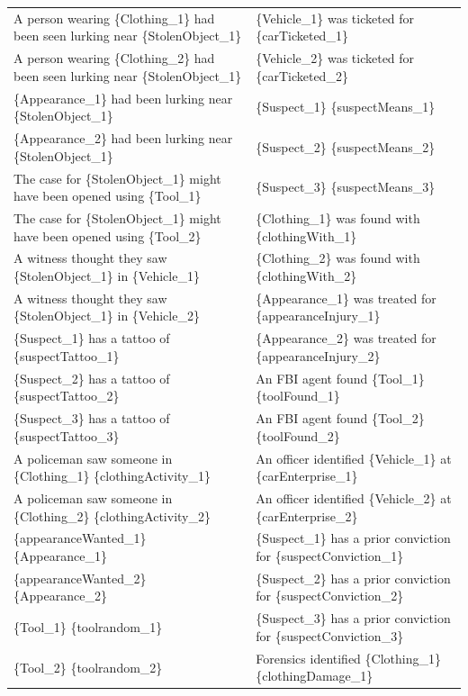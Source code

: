 \documentclass{article}
\begin{document}
\begin{landscape}
\begin{table}[]
\begin{tabular}{ll}
A person   wearing \{Clothing\_1\} had been seen lurking near \{StolenObject\_1\} & \{Vehicle\_1\} was ticketed for   \{carTicketed\_1\} \\
A person   wearing \{Clothing\_2\} had been seen lurking near \{StolenObject\_1\} & \{Vehicle\_2\} was ticketed for   \{carTicketed\_2\} \\
\{Appearance\_1\}   had been lurking near \{StolenObject\_1\} & \{Suspect\_1\} \{suspectMeans\_1\} \\
\{Appearance\_2\}   had been lurking near \{StolenObject\_1\} & \{Suspect\_2\} \{suspectMeans\_2\} \\
The case   for \{StolenObject\_1\} might have been opened using \{Tool\_1\} & \{Suspect\_3\} \{suspectMeans\_3\} \\
The case   for \{StolenObject\_1\} might have been opened using \{Tool\_2\} & \{Clothing\_1\} was found with   \{clothingWith\_1\} \\
A   witness thought they saw \{StolenObject\_1\} in \{Vehicle\_1\} & \{Clothing\_2\} was found with   \{clothingWith\_2\} \\
A   witness thought they saw \{StolenObject\_1\} in \{Vehicle\_2\} & \{Appearance\_1\} was treated for   \{appearanceInjury\_1\} \\
\{Suspect\_1\}   has a tattoo of \{suspectTattoo\_1\} & \{Appearance\_2\} was treated for   \{appearanceInjury\_2\} \\
\{Suspect\_2\}   has a tattoo of \{suspectTattoo\_2\} & An FBI agent found \{Tool\_1\}   \{toolFound\_1\} \\
\{Suspect\_3\}   has a tattoo of \{suspectTattoo\_3\} & An FBI agent found \{Tool\_2\}   \{toolFound\_2\} \\
A   policeman saw someone in \{Clothing\_1\} \{clothingActivity\_1\} & An officer identified   \{Vehicle\_1\} at \{carEnterprise\_1\} \\
A   policeman saw someone in \{Clothing\_2\} \{clothingActivity\_2\} & An officer identified   \{Vehicle\_2\} at \{carEnterprise\_2\} \\
\{appearanceWanted\_1\}   \{Appearance\_1\} & \{Suspect\_1\} has a prior   conviction for \{suspectConviction\_1\} \\
\{appearanceWanted\_2\}   \{Appearance\_2\} & \{Suspect\_2\} has a prior   conviction for \{suspectConviction\_2\} \\
\{Tool\_1\}   \{toolrandom\_1\} & \{Suspect\_3\} has a prior   conviction for \{suspectConviction\_3\} \\
\{Tool\_2\}   \{toolrandom\_2\} & Forensics identified   \{Clothing\_1\} \{clothingDamage\_1\} \\

\end{tabular}
\end{table}
\end{landscape}
\end{document}

